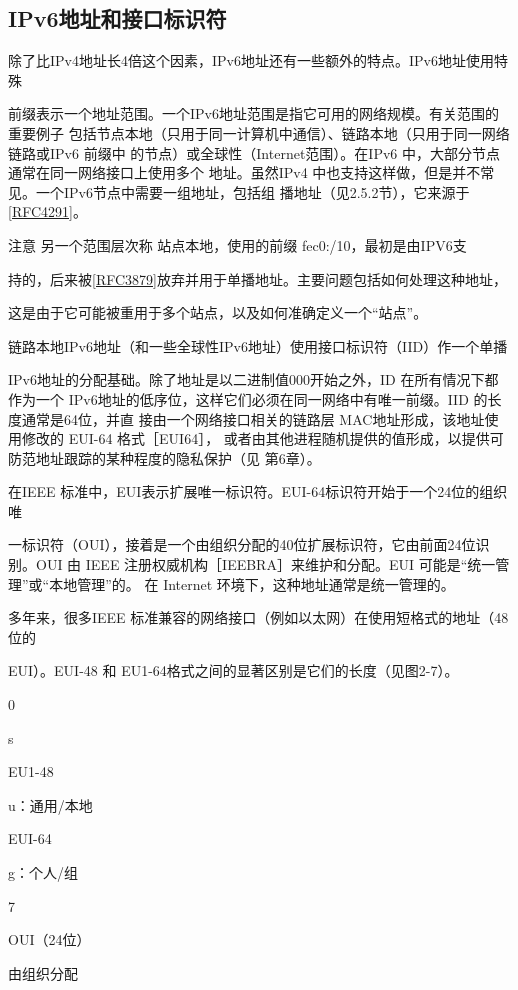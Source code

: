 \subsection{IPv6地址和接口标识符}
除了比IPv4地址长4倍这个因素，IPv6地址还有一些额外的特点。IPv6地址使用特殊

前缀表示一个地址范围。一个IPv6地址范围是指它可用的网络规模。有关范围的重要例子
包括节点本地（只用于同一计算机中通信）、链路本地（只用于同一网络链路或IPv6 前缀中
的节点）或全球性（Internet范围）。在IPv6 中，大部分节点通常在同一网络接口上使用多个
地址。虽然IPv4 中也支持这样做，但是并不常见。一个IPv6节点中需要一组地址，包括组
播地址（见2.5.2节），它来源于\href{https://www.rfc-editor.org/rfc/rfc4291}{[RFC4291]}。

注意 另一个范围层次称 站点本地，使用的前缀 fec0:/10，最初是由IPV6支

持的，后来被\href{https://www.rfc-editor.org/rfc/rfc3879}{[RFC3879]}放弃并用于单播地址。主要问题包括如何处理这种地址，

这是由于它可能被重用于多个站点，以及如何准确定义一个“站点”。

链路本地IPv6地址（和一些全球性IPv6地址）使用接口标识符（IID）作一个单播

IPv6地址的分配基础。除了地址是以二进制值000开始之外，ID 在所有情况下都作为一个
IPv6地址的低序位，这样它们必须在同一网络中有唯一前缀。IID 的长度通常是64位，并直
接由一个网络接口相关的链路层 MAC地址形成，该地址使用修改的 EUI-64 格式［EUI64］，
或者由其他进程随机提供的值形成，以提供可防范地址跟踪的某种程度的隐私保护（见
第6章）。

在IEEE 标准中，EUI表示扩展唯一标识符。EUI-64标识符开始于一个24位的组织唯

一标识符（OUI），接着是一个由组织分配的40位扩展标识符，它由前面24位识别。OUI 由
IEEE 注册权威机构［IEEBRA］来维护和分配。EUI 可能是“统一管理”或“本地管理”的。
在 Internet 环境下，这种地址通常是统一管理的。

多年来，很多IEEE 标准兼容的网络接口（例如以太网）在使用短格式的地址（48位的

EUI）。EUI-48 和 EU1-64格式之间的显著区别是它们的长度（见图2-7）。

0

s

EU1-48

u：通用/本地

EUI-64

g：个人/组

7

OUI（24位）

由组织分配

